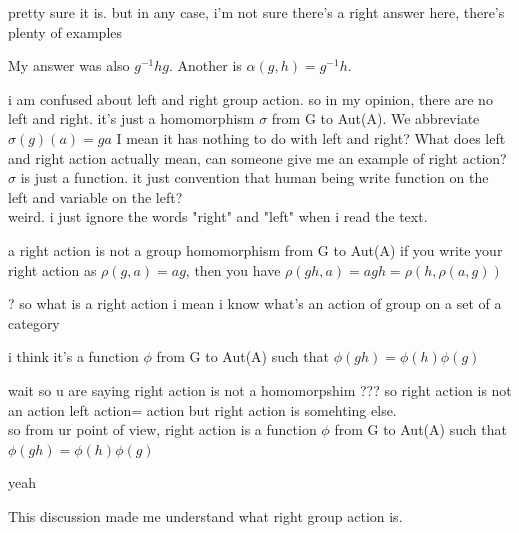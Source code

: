 \documentclass[15pt]{scrartcl}
\begin{document}
\begin{discussion*}
\begin{abboy*}
    \end{abboy*}
    \begin{arthur*}
        pretty sure it is. but in any case, i'm not sure there's a right answer here, there's plenty of examples
    \end{arthur*}
    \begin{evie*}
        My answer was also $g^{-1}hg$. Another is $\alpha(g,h)=g^{-1}h$.
    \end{evie*}
    \begin{abboy*}
        i am confused about left and right group action. so in my opinion, there are no left and right. it's just a homomorphism $\sigma$ from G to Aut(A). We abbreviate $\sigma (g)(a) =ga$ I mean it has nothing to do with left and right? What does left and right action actually mean, can someone give me an example of right action? 
        \\
        $\sigma $ is just a function. it just convention that human being write function on the left and variable on the left?
        \\
        weird.
        i just ignore the words "right" and "left" when i read the text.
    \end{abboy*}
    \begin{arthur*}
        a right action is not a group homomorphism from G to Aut(A)
        if you write your right action as $\rho(g, a) = a g$, then you have $\rho( gh, a) = agh = \rho(h, \rho(a, g))$
    \end{arthur*}
    \begin{abboy*}
        ?
        so what is a right action
        i mean i know what's an action of group on a set of a category
    \end{abboy*}
    \begin{arthur*}
        i think it's a function $\phi$ from G to Aut(A) such that $\phi(g h)= \phi(h) \phi(g)$ 
    \end{arthur*}
    \begin{abboy*}
        wait
        so u are saying right action is not a homomorpshim
        ???
        so right action is not an action
        left action= action but right action is somehting else. 
        \\
        so from ur point of view, right action is a function $\phi$ from G to Aut(A) such that $\phi(g h)= \phi(h) \phi(g)$
    \end{abboy*}
    \begin{arthur*}
        yeah
    \end{arthur*}
    This discussion made me understand what right group action is. 
\end{discussion*}
\end{document}
